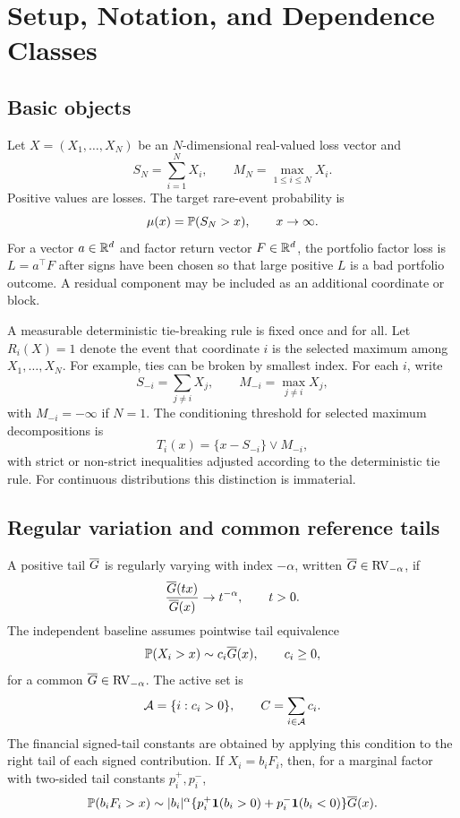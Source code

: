 \section{Setup, Notation, and Dependence Classes}
\label{sec:setup}

\subsection{Basic objects}

Let \(X=(X_1,\ldots,X_N)\) be an \(N\)-dimensional real-valued loss vector and
\[
  S_N=\sum_{i=1}^N X_i, \qquad M_N=\max_{1\le i\le N} X_i.
\]
Positive values are losses. The target rare-event probability is
\[
  \mu(x)=\mathbb{P}(S_N>x), \qquad x\to\infty.
\]
For a vector \(a\in\mathbb{R}^d\) and factor return vector \(F\in\mathbb{R}^d\), the
portfolio factor loss is \(L=a^\top F\) after signs have been chosen so that
large positive \(L\) is a bad portfolio outcome. A residual component may be
included as an additional coordinate or block.

A measurable deterministic tie-breaking rule is fixed once and for all. Let
\(R_i(X)=1\) denote the event that coordinate \(i\) is the selected maximum
among \(X_1,\ldots,X_N\). For example, ties can be broken by smallest index.
For each \(i\), write
\[
  S_{-i}=\sum_{j\ne i}X_j, \qquad
  M_{-i}=\max_{j\ne i}X_j,
\]
with \(M_{-i}=-\infty\) if \(N=1\). The conditioning threshold for selected
maximum decompositions is
\[
  T_i(x)=\{x-S_{-i}\}\vee M_{-i},
\]
with strict or non-strict inequalities adjusted according to the deterministic
tie rule. For continuous distributions this distinction is immaterial.

\subsection{Regular variation and common reference tails}

A positive tail \(\overline{G}\) is regularly varying with index \(-\alpha\), written
\(\overline{G}\in \mathrm{RV}_{-\alpha}\), if
\[
  \frac{\overline{G}(tx)}{\overline{G}(x)}\to t^{-\alpha}, \qquad t>0.
\]
The independent baseline assumes pointwise tail equivalence
\[
  \mathbb{P}(X_i>x)\sim c_i\overline{G}(x), \qquad c_i\ge 0,
\]
for a common \(\overline{G}\in\mathrm{RV}_{-\alpha}\). The active set is
\[
  \mathcal{A}=\{i:c_i>0\}, \qquad C=\sum_{i\in\mathcal{A}}c_i.
\]
The financial signed-tail constants are obtained by applying this condition to
the right tail of each signed contribution. If \(X_i=b_iF_i\), then, for a
marginal factor with two-sided tail constants \(p_i^+,p_i^-\),
\[
  \mathbb{P}(b_iF_i>x)\sim |b_i|^\alpha
  \{p_i^+\mathbf{1}(b_i>0)+p_i^-\mathbf{1}(b_i<0)\}\overline{G}(x).
\]

